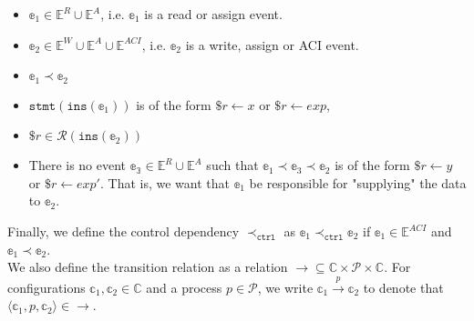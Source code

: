 \documentclass{article}
\begin{document}
\begin{itemize}
    \setlength\itemsep{0em}
    \item $\mathbb{e}_1 \in \mathbb{E}^R \cup \mathbb{E}^A$, i.e. $\mathbb{e}_1$ is a read or assign event.
    \item $\mathbb{e}_2 \in \mathbb{E}^W \cup \mathbb{E}^A \cup \mathbb{E}^{ACI}$, i.e. $\mathbb{e}_2$ is a write, assign or ACI event.
    \item $\mathbb{e}_1 \prec \mathbb{e}_2$
    \item $\texttt{stmt}(\texttt{ins}(\mathbb{e}_1))$ is of the form $\$r \leftarrow x$ or $\$r \leftarrow exp$,
    \item $\$r \in \mathcal{R}(\texttt{ins}(\mathbb{e}_2))$
    \item There is no event $\mathbb{e_3} \in \mathbb{E}^R \cup \mathbb{E}^A$ such that $\mathbb{e}_1 \prec \mathbb{e}_3 \prec \mathbb{e}_2$ is of the form $\$r \leftarrow y$ or $\$r \leftarrow exp'$. That is, we want that $\mathbb{e}_1$ be responsible for "supplying" the data to $\mathbb{e}_2$.
\end{itemize}
Finally, we define the control dependency $\prec_\texttt{ctrl}$ as $\mathbb{e}_1 \prec_\texttt{ctrl} \mathbb{e}_2$ if $\mathbb{e}_1 \in \mathbb{E}^{ACI}$ and $\mathbb{e}_1 \prec \mathbb{e}_2$.\\
We also define the transition relation as a relation $\longrightarrow \subseteq \mathbb{C} \times \mathcal{P} \times \mathbb{C}$. For configurations $\mathbb{c}_1,\mathbb{c}_2 \in \mathbb{C}$ and a process $p \in \mathcal{P}$, we write $\mathbb{c}_1 \xrightarrow{p} \mathbb{c}_2$ to denote that $\langle\mathbb{c}_1,p,\mathbb{c}_2\rangle \in \longrightarrow$.
\vspace{-1em}
\end{document}
